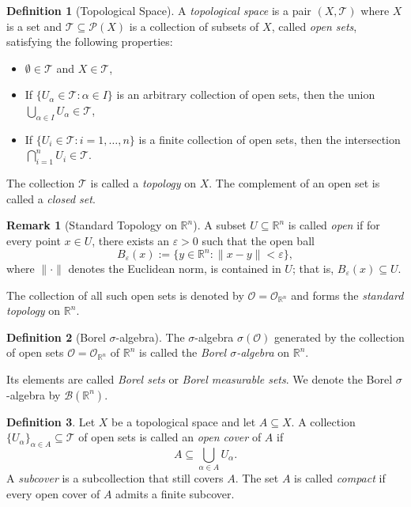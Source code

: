 \documentclass[12pt]{article}
\theoremstyle{definition}
\newtheorem{definition}{Definition}[section]
\newtheorem{remark}{Remark}[section]
\begin{document}
\medskip
\begin{definition}[Topological Space]
A \textit{topological space} is a pair $(X, \mathcal{T})$ where $X$ is a set and $\mathcal{T} \subseteq \mathcal{P}(X)$ is a collection of subsets of $X$, called \textit{open sets}, satisfying the following properties:
\begin{itemize}
    \item $\emptyset \in \mathcal{T}$ and $X \in \mathcal{T}$,
    \item If $\{U_\alpha \in \mathcal{T} : \alpha \in I\}$ is an arbitrary collection of open sets, then the union $\bigcup_{\alpha \in I} U_\alpha \in \mathcal{T}$,
    \item If $\{U_i \in \mathcal{T} : i = 1, \dots, n\}$ is a finite collection of open sets, then the intersection $\bigcap_{i=1}^n U_i \in \mathcal{T}$.
\end{itemize}
The collection $\mathcal{T}$ is called a \textit{topology} on $X$. The complement of an open set is called a \textit{closed set}.
\end{definition}


\medskip
\begin{remark}[Standard Topology on \(\mathbb{R}^n\)]
A subset \( U \subseteq \mathbb{R}^n \) is called \textit{open} if for every point \( x \in U \), there exists an \(\varepsilon > 0\) such that the open ball
\[
B_\varepsilon(x) := \{ y \in \mathbb{R}^n : \|x - y\| < \varepsilon \},
\]
where \(\|\cdot\|\) denotes the Euclidean norm, is contained in \( U \); that is, \( B_\varepsilon(x) \subseteq U \).

The collection of all such open sets is denoted by \(\mathcal{O} = \mathcal{O}_{\mathbb{R}^n}\) and forms the \textit{standard topology} on \(\mathbb{R}^n\).
\end{remark}


\medskip
\begin{definition}[Borel $\sigma$-algebra]
The \(\sigma\)-algebra \(\sigma(\mathcal{O})\) generated by the collection of open sets \(\mathcal{O} = \mathcal{O}_{\mathbb{R}^n}\) of \(\mathbb{R}^n\) is called the \textit{Borel \(\sigma\)-algebra} on \(\mathbb{R}^n\). 

Its elements are called \textit{Borel sets} or \textit{Borel measurable sets}. We denote the Borel \(\sigma\)-algebra by \(\mathcal{B}(\mathbb{R}^n)\).
\end{definition}

\medskip
\begin{definition}
Let \( X \) be a topological space and let \( A \subseteq X \). A collection \( \{U_\alpha\}_{\alpha \in A} \subseteq \mathcal{T} \) of open sets is called an \emph{open cover} of \( A \) if
\[
A \subseteq \bigcup_{\alpha \in A} U_\alpha.
\]
A \emph{subcover} is a subcollection that still covers \( A \). The set \( A \) is called \emph{compact} if every open cover of \( A \) admits a finite subcover.
\end{definition}
\end{document}
